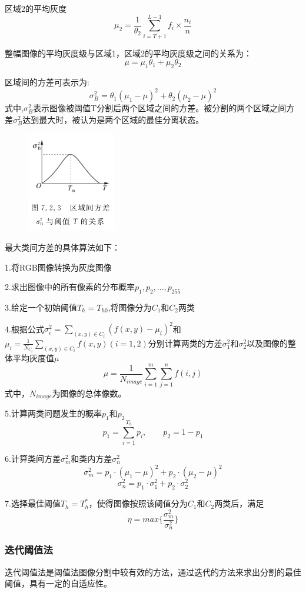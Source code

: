 \documentclass[11pt]{article}
\begin{document}
区域2的平均灰度$$\mu_2 = \frac{1}{\theta_2}\sum_{i=T+1}^{L-1}f_i\times \frac{n_i}{n}$$

整幅图像的平均灰度级与区域1，区域2的平均灰度级之间的关系为：
$$\mu = \mu_1\theta_1 + \mu_2\theta_2$$

区域间的方差可表示为:$$\sigma_B^2 = \theta_1(\mu_1-\mu)^2 + \theta_2(\mu_2-\mu)^2$$
式中,$\sigma_B^2$表示图像被阈值T分割后两个区域之间的方差。被分割的两个区域之间方差$\sigma_B^2$达到最大时，被认为是两个区域的最佳分离状态。

\begin{figure}
	\centering
	\includegraphics[width=0.23\textheight]{51}
\end{figure}

最大类间方差的具体算法如下：

1.将RGB图像转换为灰度图像

2.求出图像中的所有像素的分布概率$p_1,p_2,...,p_255$

3.给定一个初始阈值$T_h = T_{h0}$,将图像分为$C_1$和$C_2$两类

4.根据公式$\sigma_i^2 = \sum_{(x,y)\in C_i}(f(x,y) - \mu_i)^2$和$\mu_i = \frac{1}{N_{C_i}}\sum_{(x,y)\in C_i}f(x,y)(i=1,2)$分别计算两类的方差$\sigma_1^2$和$\sigma_2^2$以及图像的整体平均灰度值$\mu$
$$\mu = \frac{1}{N_{image}}\sum_{i=1}^{m}\sum_{j=1}^{n}f(i,j)$$
式中，$N_{image}$为图像的总体像数。

5.计算两类问题发生的概率$p_1$和$p_2$
$$p_1 = \sum_{i=1}^{T_h}p_i, \qquad p_2 = 1-p_1$$

6.计算类间方差$\sigma_m^2$和类内方差$\sigma_n^2$
$$\sigma_m^2 = p_1\cdot (\mu_1 - \mu)^2 + p_2\cdot (\mu_2 - \mu)^2$$
$$\sigma_n^2 = p_1\cdot \sigma_1^2 + p_2\cdot \sigma_2^2$$

7.选择最佳阈值$T_h = T_h^*$，使得图像按照该阈值分为$C_1$和$C_2$两类后，满足$$\eta = max\{ \frac{\sigma_m^2}{\sigma_n^2}\}$$

\subsubsection{迭代阈值法}
迭代阈值法是阈值法图像分割中较有效的方法，通过迭代的方法来求出分割的最佳阈值，具有一定的自适应性。
\end{document}
